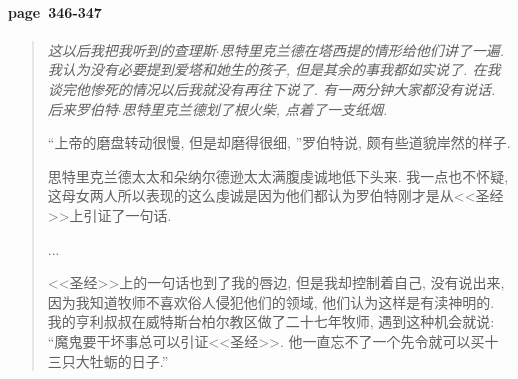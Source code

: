 \paragraph*{page~346-347}
\begin{quotation}
    \itshape
    这以后我把我听到的查理斯$\cdot$思特里克兰德在塔西提的情形给他们讲了一遍. 我认为没有必要提到爱塔和她生的孩子, 但是其余的事我都如实说了. 在我谈完他惨死的情况以后我就没有再往下说了. 有一两分钟大家都没有说话. 后来罗伯特$\cdot$思特里克兰德划了根火柴, 点着了一支纸烟.

    ``上帝的磨盘转动很慢, 但是却磨得很细, ''罗伯特说, 颇有些道貌岸然的样子.

    思特里克兰德太太和朵纳尔德逊太太满腹虔诚地低下头来. 我一点也不怀疑, 这母女两人所以表现的这么虔诚是因为他们都认为罗伯特刚才是从<<圣经>>上引证了一句话.

    ...

    <<圣经>>上的一句话也到了我的唇边, 但是我却控制着自己, 没有说出来, 因为我知道牧师不喜欢俗人侵犯他们的领域, 他们认为这样是有渎神明的. 我的亨利叔叔在威特斯台柏尔教区做了二十七年牧师, 遇到这种机会就说: ``魔鬼要干坏事总可以引证<<圣经>>. 他一直忘不了一个先令就可以买十三只大牡蛎的日子.'' 
\end{quotation}